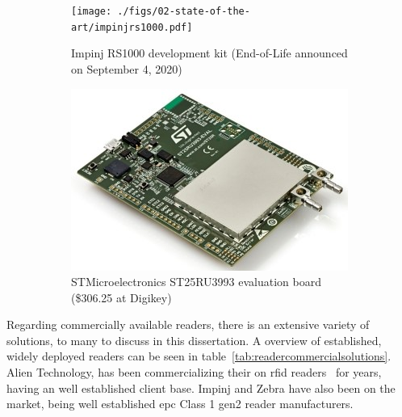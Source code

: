 \begin{figure}[H]
    \centering
    \begin{subfigure}{.35\textwidth}
        \centering
        \texttt{[image: ./figs/02-state-of-the-art/impinjrs1000.pdf]}
        \caption{Impinj RS1000 development kit (End-of-Life announced on September 4, 2020)} 
        \label{fig:impinjrs1000}
    \end{subfigure}
    \begin{subfigure}{.55\textwidth}
        \centering
        \includegraphics[width=\linewidth]{./figs/02-state-of-the-art/st25ru3993-eval.jpg}
        \caption{STMicroelectronics ST25RU3993 evaluation board (\$306.25 at Digikey)} 
        \label{fig:st25ru3993}
    \end{subfigure}
    \caption{} 
    \label{fig:devboards}
\end{figure}

Regarding commercially available readers, there is an extensive variety of solutions, to many to discuss in this dissertation. A overview of established, widely deployed readers can be seen in table~\ref{tab:readercommercialsolutions}.
Alien Technology, has been commercializing their on \ac{rfid} readers~\cite{AlienTechnologyReaders} for years, having an well established client base. Impinj and Zebra have also been on the market, being well established \ac{epc} Class 1 \ac{gen2} reader manufacturers.

